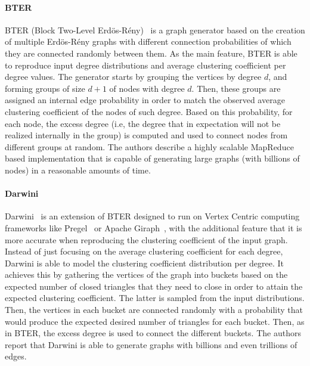 \paragraph{BTER} BTER (Block Two-Level
Erd\"{o}s-R\'{e}ny)~\cite{kolda2014scalable} is a graph generator based on the
creation of multiple Erd\"{o}s-R\'{e}ny graphs with different connection
probabilities  of which they are connected randomly between them. As the main feature, BTER is able
to reproduce input degree distributions and average clustering
coefficient per degree values. The generator starts by grouping the vertices
by degree $d$, and forming groups of size $d+1$ of nodes with degree $d$. Then, these
groups are assigned an internal edge probability in order to match the observed
average clustering coefficient of the nodes of such degree. Based on this
probability, for each node, the excess degree (i.e, the degree that in
expectation will not be realized internally in the group) is computed and used to connect
nodes from different groups at random. The authors describe a highly scalable
MapReduce based implementation that is capable of generating large graphs (with
billions of nodes) in a reasonable amounts of time.

\paragraph{Darwini} Darwini~\cite{edunov2016darwini} is an extension of BTER
designed to run on Vertex Centric computing frameworks like
Pregel~\cite{malewicz2010pregel} or Apache Giraph~\cite{ching2015one}, with the
additional feature that it is more accurate when reproducing the clustering
coefficient of the input graph. Instead of just focusing on the average
clustering coefficient for each degree, Darwini is able to model the clustering
coefficient distribution per degree. It achieves this by gathering the vertices
of the graph into buckets based on the expected number of closed triangles that they need
to close in order to attain the expected clustering coefficient. The latter is
sampled from the input distributions. Then, the vertices in each bucket are
connected randomly with a probability that would produce the expected
desired number of triangles for each bucket. Then, as in BTER, the excess degree
is used to connect the different buckets. The authors report that Darwini is
able to generate graphs with billions and even trillions of edges.





